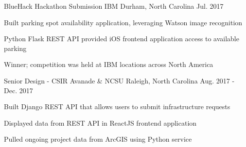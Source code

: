 
\begin{cventries}
	
	\cventry
		{BlueHack Hackathon Submission} %
		{IBM} %
		{Durham, North Carolina} %
		{Jul. 2017} %
		{
			\begin{cvitems} %
				\item {Built parking spot availability application, leveraging Watson image recognition}
				\item {Python Flask REST API provided iOS frontend application access to available parking}
				\item {Winner; competition was held at IBM locations across North America}
			\end{cvitems}
		}
	
	\cventry
		{Senior Design - CSIR} %
		{Avanade \& NCSU} %
		{Raleigh, North Carolina} %
		{Aug. 2017 - Dec. 2017} %
	{
		\begin{cvitems} %
			\item {Built Django REST API that allows users to submit infrastructure requests}
			\item {Displayed data from REST API in ReactJS frontend application}
			\item {Pulled ongoing project data from ArcGIS using Python service}
		\end{cvitems}
	}
	



\end{cventries}
